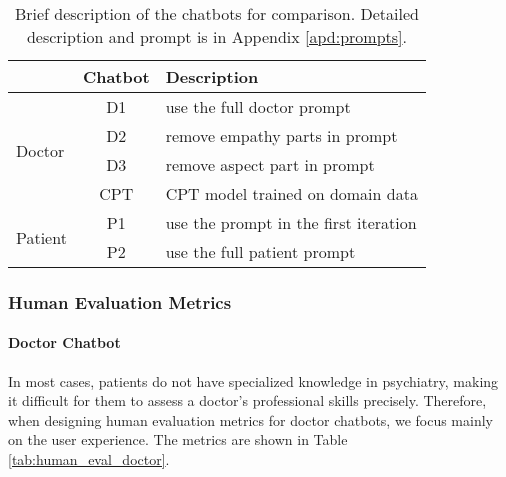 \begin{table}[h]
    \centering
    \footnotesize
    \begin{tabular}{m{}|c|m{}}
    \hline
    & Chatbot & Description \\
    \hline
    \multirow{4}{0.1\columnwidth}{Doctor} & D1 & use the full doctor prompt \\
    \cline{2-3}
    & D2 & remove empathy parts in prompt  \\
    \cline{2-3}
    & D3 &  remove aspect part in prompt \\
    \cline{2-3}
    & CPT & CPT model trained on domain data \\
    \hline
    \multirow{2}{0.1\columnwidth}{Patient} & P1 & use the prompt in the first iteration \\
    \cline{2-3}
    & P2 & use the full patient prompt\\
    \hline
    \end{tabular}
    \caption{Brief description of the chatbots for comparison. Detailed description and prompt is in Appendix \ref{apd:prompts}.}
    \label{tab:cmp_chatbots}
\end{table}



\subsubsection{Human Evaluation Metrics}
\label{sec:eval_metrics}

\paragraph{Doctor Chatbot}
In most cases, patients do not have specialized knowledge in psychiatry, making it difficult for them to assess a doctor's professional skills precisely. Therefore, when designing human evaluation metrics for doctor chatbots, we focus mainly on the user experience. The metrics are shown in Table \ref{tab:human_eval_doctor}.


